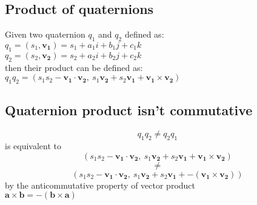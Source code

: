 \subsection{Product of quaternions}
Given two quaternion $q_1$ and $q_2$ defined as: \\
$q_1 = (s_1,\boldsymbol{v_1})=s_1+a_1i+b_1j+c_1k$ \\
$q_2=(s_2,\boldsymbol{v_2})=s_2+a_2i+b_2j+c_2k$ \\
then their product can be defined as: \\
$q_1 q_2 = (s_1 s_2 - \boldsymbol{v_1 \cdot v_2}, \ s_1 \boldsymbol{v_2} + s_2 \boldsymbol{v_1} + \boldsymbol{v_1} \times \boldsymbol{v_2})$

\subsection{Quaternion product isn't commutative}
$$q_1 q_2 \neq q_2 q_1$$ 
\centering
is equivalent to
$$(s_1 s_2 - \boldsymbol{v_1 \cdot v_2}, \ s_1 \boldsymbol{v_2} + s_2 \boldsymbol{v_1} + \boldsymbol{v_1} \times \boldsymbol{v_2})$$
$$ \neq $$
$$(s_1 s_2 - \boldsymbol{v_1 \cdot v_2}, \ s_1 \boldsymbol{v_2} + s_2 \boldsymbol{v_1} + - (\boldsymbol{v_1} \times \boldsymbol{v_2}))$$ 
\justify
by the anticommutative property of vector product \cite{amslaurea6701} \\
$ \boldsymbol{a} \times \boldsymbol{b} = - (\boldsymbol{b} \times \boldsymbol{a}) $

